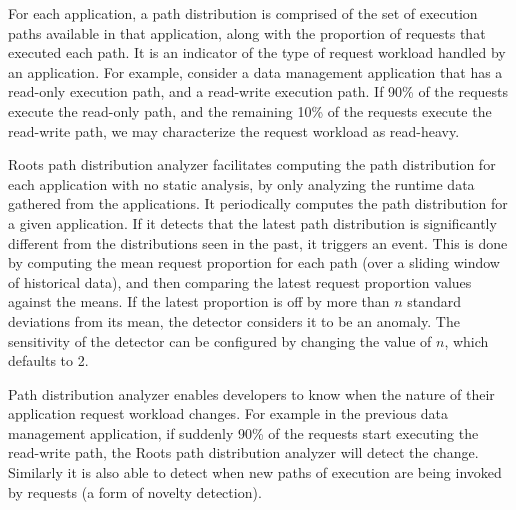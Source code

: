 For each application,
a path distribution is comprised of the set of execution paths available in
that application, along with the proportion of requests that executed each path.
It is an indicator of the type of request workload handled by an application.
For example, consider a data management application that has a read-only execution path, and a read-write 
execution path. If 90\% of the requests execute the read-only path, and the remaining 10\% of the requests
execute the read-write path, we may characterize the request workload as read-heavy.

%
 
Roots path distribution analyzer facilitates computing the path distribution for each application
with no static analysis, by only analyzing the runtime data gathered from the applications.
It periodically computes the path distribution for a given application.
If it detects that the latest path distribution is significantly different from the distributions seen in the 
past, it triggers an event. This is done by computing the mean request proportion for each path
(over a sliding window of historical data),
and then comparing the latest request proportion values against the means. If the latest proportion
is off by more than $n$ standard deviations from its mean, the detector considers it to be an
anomaly. The sensitivity of the detector can be configured by changing the value of $n$, which
defaults to 2. 

Path distribution analyzer enables developers to know when the nature of their application request
workload changes. For example in the previous data management application, if suddenly 90\%
of the requests start executing the read-write path, the Roots path distribution analyzer will
detect the change. Similarly it is also able to detect when new paths of execution
are being invoked by requests (a form of novelty detection).

